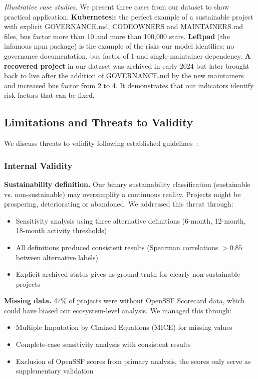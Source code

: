\documentclass[conference]{IEEEtran}
\begin{document}
\textit{Illustrative case studies.} We present three cases from our dataset to show practical application. \textbf{Kubernetes}is the  perfect example of a sustainable project with explicit GOVERNANCE.md, CODEOWNERS and MAINTAINERS.md files, bus factor more than 10 and more than 100,000 stars. \textbf{Leftpad} (the infamous npm package) is the example of the risks our model identifies: no governance documentation, bus factor of 1 and single-maintainer dependency. \textbf{A recovered project} in our dataset was archived in early 2024 but later brought back to live after the addition of GOVERNANCE.md by the new maintainers and increased bus factor from 2 to 4. It demonstrates that our indicators identify risk factors that can be fixed.

\subsection{Limitations and Threats to Validity}

We discuss threats to validity following established guidelines~\cite{mockus2002}:

\subsubsection{Internal Validity}

\textbf{Sustainability definition.} Our binary sustainability classification (sustainable vs. non-sustainable) may oversimplify a continuous reality. Projects might be prospering, deteriorating or abandoned. We addressed this threat through:
\begin{itemize}
    \item Sensitivity analysis using three alternative definitions (6-month, 12-month, 18-month activity thresholds)
    \item All definitions produced consistent results (Spearman correlations $> 0.85$ between alternative labels)
    \item Explicit archived status gives us ground-truth for clearly non-sustainable projects
\end{itemize}

\textbf{Missing data.} 47\% of projects were without OpenSSF Scorecard data, which could have biased our ecosystem-level analysis. We managed this through:
\begin{itemize}
    \item Multiple Imputation by Chained Equations (MICE) for missing values
    \item Complete-case sensitivity analysis with consistent results
    \item Exclusion of OpenSSF scores from primary analysis, the scores only serve as supplementary validation
\end{itemize}
\end{document}
